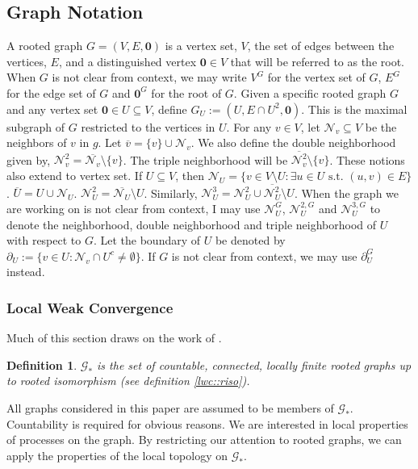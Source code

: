 \documentclass[12pt]{article}
\newcommand{\mc}{\mathcal}
\newcommand{\ov}{\overline}
\newcommand{\te}{\text}
\newcommand{\defeq}{:=}								%
\newcommand{\neigh}[1]{\mc{N}_{#1}}					%
\newcommand{\dneigh}[1]{\mc{N}^2_{#1}}				%
\newcommand{\tneigh}[1]{\mc{N}^3_{#1}}				%
\newcommand{\gneigh}[2]{\mc{N}^{#1}_{#2}}			%
\newcommand{\dgneigh}[2]{\mc{N}^{2,#1}_{#2}}		%
\newcommand{\tgneigh}[2]{\mc{N}^{3,#1}_{#2}}		%
\newcommand{\bdry}[1]{\partial_{#1}}				%
\newcommand{\gbdry}[2]{\partial^{#1}_{#2}}			%
\newcommand{\cl}[1]{\ov{#1}}						%
\renewcommand{\root}{\mathbf{0}}					%
\newcommand{\subg}[1]{_{#1}}						%
\newcommand{\gind}[1]{^{#1}}						%
\newcommand{\Gs}{\mc{G}_\ast}						%
\newtheorem{defn}[thms]{Definition}
\begin{document}
\subsection{Graph Notation}
\label{not::g}

A rooted graph \(G = (V,E,\root)\) is a vertex set, \(V\), the set of edges between the vertices, \(E\), and a distinguished vertex \(\root \in V\) that will be referred to as the root. When \(G\) is not clear from context, we may write \(V\gind{G}\) for the vertex set of \(G\), \(E\gind{G}\) for the edge set of \(G\) and \(\root\gind{G}\) for the root of \(G\). Given a specific rooted graph \(G\) and any vertex set \(\root \in U \subseteq V\), define \(G\subg{U} \defeq (U,E\cap U^2,\root)\). This is the maximal subgraph of \(G\) restricted to the vertices in \(U\). For any \(v \in V\), let \(\neigh{v}\subseteq V\) be the neighbors of \(v\) in \(g\). Let \(\cl{v} = \{v\}\cup\neigh{v}\). We also define the double neighborhood given by, \(\dneigh{v} = \cl{\neigh{v}}\setminus \{v\}\). The triple neighborhood will be \(\cl{\dneigh{v}} \setminus \{v\}\). These notions also extend to vertex set. If \(U\subseteq V\), then \(\neigh{U} = \{v \in V\setminus U: \exists u \in U\te{ s.t. } (u,v) \in E\}\). \(\cl{U} = U\cup \neigh{U}\). \(\dneigh{U} = \cl{\neigh{U}}\setminus U\). Similarly, \(\tneigh{U} = \dneigh{U} \cup \cl{\dneigh{U}}\setminus U\). When the graph we are working on is not clear from context, I may use \(\gneigh{G}{U}\), \(\dgneigh{G}{U}\) and \(\tgneigh{G}{U}\) to denote the neighborhood, double neighborhood and triple neighborhood of \(U\) with respect to \(G\). Let the boundary of \(U\) be denoted by \(\bdry{U} \defeq \{v \in U: \neigh{v}\cap U^c \neq \emptyset\}\). If \(G\) is not clear from context, we may use \(\gbdry{G}{U}\) instead.

\subsubsection{Local Weak Convergence}
\label{g::lwc}

Much of this section draws on the work of \cite{LacRamWu19}.

\begin{defn}
\(\Gs\) is the set of countable, connected, locally finite rooted graphs up to rooted isomorphism (see definition \ref{lwc::riso}).
\label{lwc::gstar}
\end{defn}

All graphs considered in this paper are assumed to be members of \(\Gs\). Countability is required for obvious reasons. We are interested in local properties of processes on the graph. By restricting our attention to rooted graphs, we can apply the properties of the local topology on \(\Gs\). 
\end{document}
